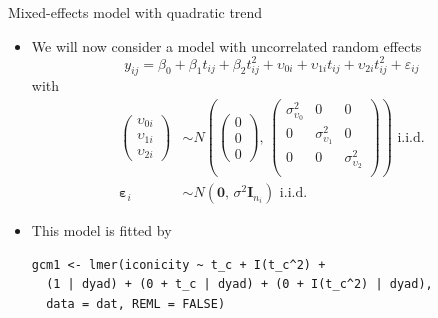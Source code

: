 \documentclass[aspectratio=169]{beamer}
\newcommand{\vect}[1]{\mathbf{#1}}
\newcommand{\mat}[1]{\mathbf{#1}}
\newcommand{\gvect}[1]{\boldsymbol{#1}}
\begin{document}
\begin{frame}[fragile]{Mixed-effects model with quadratic trend}
  \begin{itemize}
    \item We will now consider a model with uncorrelated random effects
  \[
    y_{ij} = \beta_0 + \beta_1 t_{ij} + \beta_2 t^2_{ij} + \upsilon_{0i} +
    \upsilon_{1i} t_{ij} + \upsilon_{2i} t^2_{ij} + \varepsilon_{ij}
  \]
with
\begin{align*}
  \begin{pmatrix}
    \upsilon_{0i}\\
    \upsilon_{1i}\\
    \upsilon_{2i}
  \end{pmatrix} &\sim
  N \left(\begin{pmatrix}
      0\\ 0\\ 0
  \end{pmatrix}, \,
  \begin{pmatrix}
    \sigma^2_{\upsilon_0} & 0 & 0\\
    0 & \sigma^2_{\upsilon_1} & 0\\
    0 & 0 & \sigma^2_{\upsilon_2}\\
      \end{pmatrix} \right)
    \text{ i.i.d.} \\
  \gvect{\varepsilon}_i &\sim N(\vect{0}, \, \sigma^2 \mat{I}_{n_i})
    \text{ i.i.d.}
\end{align*}
\vspace{-.8cm}
  \item This model is fitted by
\begin{lstlisting}
gcm1 <- lmer(iconicity ~ t_c + I(t_c^2) +
  (1 | dyad) + (0 + t_c | dyad) + (0 + I(t_c^2) | dyad),
  data = dat, REML = FALSE)
\end{lstlisting}
  \end{itemize}
\end{frame}
\end{document}
